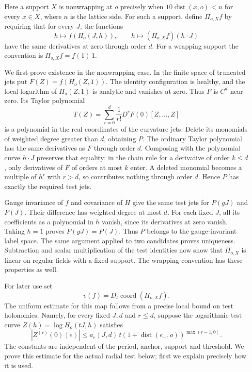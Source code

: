 Here a support $X$ is nonwrapping at $o$ precisely when
$10\operatorname{dist}(x,o)<n$ for every $x\in X$, where $n$ is
the lattice side. For such a support, define $\Pi_{o,X}f$ by requiring that
for every $J$, the functions
\[
       h\longmapsto f(H_o(J,h)),\qquad
       h\longmapsto (\Pi_{o,X}f)(h\cdot J)
\]
have the same derivatives at zero through order $d$.
For a wrapping support the convention is
$\Pi_{o,X}f=f(1)\,1$.

We first prove existence in the nonwrapping case. In the finite space
of truncated jets put $F(Z)=f(H_o(Z,1))$. The identity configuration
is healthy, and the local logarithm of $H_o(Z,1)$ is analytic and
vanishes at zero. Thus $F$ is $C^d$ near zero. Its Taylor polynomial
\[
        T(Z)=\sum_{r=0}^d\frac1{r!}D^rF(0)[Z,\ldots,Z]
\]
is a polynomial in the real coordinates of the curvature jets.
Delete its monomials of weighted degree greater than $d$, obtaining
$P$. The ordinary Taylor polynomial has the same derivatives as $F$
through order $d$. Composing with the polynomial curve $h\cdot J$
preserves that equality: in the chain rule for a derivative of order
$k\le d$, only derivatives of $F$ of orders at most $k$ enter.
A deleted monomial becomes a multiple of $h^r$ with $r>d$, so contributes
nothing through order $d$. Hence $P$ has exactly the required test jets.

Gauge invariance of $f$ and covariance of $H$ give the same test jets
for $P(gJ)$ and $P(J)$. Their difference has weighted degree at most
$d$. For each fixed $J$, all its coefficients as a polynomial in $h$
vanish, since its derivatives at zero vanish. Taking $h=1$ proves
$P(gJ)=P(J)$. Thus $P$ belongs to the gauge-invariant label space.
The same argument applied to two candidates proves uniqueness.
Subtraction and scalar multiplication of the test identities now show
that $\Pi_{o,X}$ is linear on regular fields with a fixed support.
The wrapping convention has these properties as well.

For later use set
\[
                  v(f)=D_t\operatorname{coord}(\Pi_{o,X}f).
\]
The uniform estimate for this map follows from a precise local bound
on test holonomies. Namely, for every fixed $J,d$ and $r\le d$, suppose
the logarithmic test curve $Z(h)=\log H_o(tJ,h)$ satisfies
\begin{equation}\label{eq:local-test-log-input}
 |Z^{(r)}(0)(e)|\le a_r(J,d)\,t
                    (1+\operatorname{dist}(e_-,o))^{\max(r-1,0)}.
\end{equation}
The constants are independent of the period, anchor, support and
threshold. We prove this estimate for the actual radial test below;
first we explain precisely how it is used.

